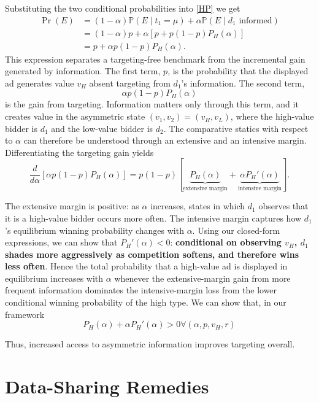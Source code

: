 \noindent Substituting the two conditional probabilities into \eqref{HP} we get
\begin{align*}
\Pr(E)
&=
(1-\alpha)\mathbb{P}(E \mid t_1=\mu)
+
\alpha\mathbb{P}(E\mid d_1\text{ informed}) \\
&=
(1-\alpha)p+\alpha\left[p+p(1-p)P_H(\alpha)\right] \\
&=
p+\alpha p(1-p)P_H(\alpha).
\end{align*}
This expression separates a targeting-free benchmark from the incremental gain generated by information. The first term, $p$, is the probability that the displayed ad generates value $v_H$ absent targeting from $d_1$'s information. The second term,
\[
\alpha p(1-p)P_H(\alpha)
\]
is the gain from targeting. Information matters only through this term, and it creates value in the asymmetric state $(v_1,v_2)=(v_H,v_L)$, where the high-value bidder is $d_1$ and the low-value bidder is $d_2$. The comparative statics with respect to $\alpha$ can therefore be understood through an extensive and an intensive margin. Differentiating the targeting gain yields
\[
\frac{d}{d\alpha}\left[\alpha p(1-p)P_H(\alpha)\right]
=
p(1-p)
\left[
\underbrace{P_H(\alpha)}_{\text{extensive margin}}
+
\underbrace{\alpha P_H'(\alpha)}_{\text{intensive margin}}
\right].
\]

\noindent The extensive margin is positive: as $ \alpha $ increases, states in which $ d_1 $ observes that it is a high-value bidder occurs more often. The intensive margin captures how $ d_1 $'s equilibrium winning probability changes with $ \alpha $. Using our closed-form expressions, we can show that $ P_H'(\alpha) < 0 $: \textbf{conditional on observing $ v_H $, $ d_1 $ shades more aggressively as competition softens, and therefore wins less often}. Hence the total probability that a high-value ad is displayed in equilibrium increases with $ \alpha $ whenever the extensive-margin gain from more frequent information dominates the intensive-margin loss from the lower conditional winning probability of the high type. We can show that, in our framework
\[
P_H(\alpha) + \alpha P_H'(\alpha) > 0  \forall (\alpha, p, v_H, r)
\]

\noindent Thus, increased access to asymmetric information improves targeting overall.

\section{Data-Sharing Remedies}\label{sec:data-sharing}\label{licensing}

